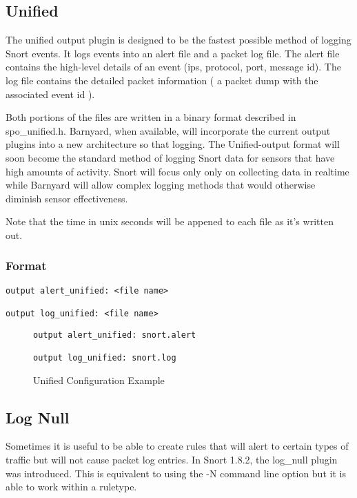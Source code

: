 \documentclass[english]{report}
\begin{document}
\subsection{Unified}

The unified output plugin is designed to be the fastest possible method
of logging Snort events. It logs events into an alert file and a packet
log file. The alert file contains the high-level details of an event
(ips, protocol, port, message id). The log file contains the detailed
packet information ( a packet dump with the associated event id ).

Both portions of the files are written in a binary format described
in spo\_unified.h. Barnyard, when available, will incorporate the
current output plugins into a new architecture so that logging. The
Unified-output format will soon become the standard method of logging
Snort data for sensors that have high amounts of activity. Snort will
focus only only on collecting data in realtime while Barnyard will
allow complex logging methods that would otherwise diminish sensor
effectiveness. 

Note that the time in unix seconds will be appened to each file as
it's written out.

\subsubsection{Format}

\begin{verbatim}
output alert_unified: <file name> 

output log_unified: <file name>
\end{verbatim}
%
\begin{figure}[!hbpt]
\begin{verbatim}
output alert_unified: snort.alert 

output log_unified: snort.log
\end{verbatim}

\caption{Unified Configuration Example\label{unified example}}
\end{figure}

\subsection{Log Null}

Sometimes it is useful to be able to create rules that will alert
to certain types of traffic but will not cause packet log entries.
In Snort 1.8.2, the log\_null plugin was introduced. This is equivalent
to using the -N command line option but it is able to work within
a ruletype.
\end{document}
